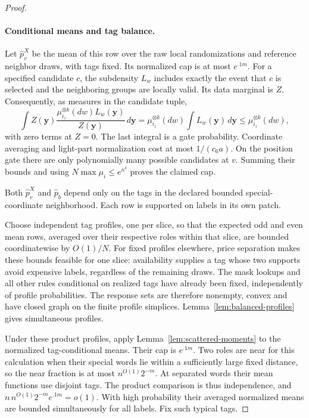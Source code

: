 \begin{proof}
\paragraph{Conditional means and tag balance.}
Let \(\widehat p_v^X\) be the mean of this row over the raw local randomizations and reference neighbor draws, with tags fixed. Its normalized cap is at most \(e^{.1m}\). For a specified candidate \(c\), the subdensity \(L_w\) includes exactly the event that \(c\) is selected and the neighboring groups are locally valid. Its data marginal is \(Z\). Consequently, as measures in the candidate tuple,
\[
 \int Z(\mathbf y)
       \frac{\mu_{i_z}^{\otimes k}(dw)L_w(\mathbf y)}{Z(\mathbf y)}
          \,d\mathbf y
 =\mu_{i_z}^{\otimes k}(dw)\int L_w(\mathbf y)\,d\mathbf y
 \le\mu_{i_z}^{\otimes k}(dw),
\]
with zero terms at \(Z=0\). The last integral is a gate probability. Coordinate averaging and light-part normalization cost at most \(1/(c_6a)\). On the position gate there are only polynomially many possible candidates at \(v\). Summing their bounds and using \(N\max\mu_i\le e^{n^\delta}\) proves the claimed cap.

Both \(\widehat p_v^X\) and \(\widehat p_b\) depend only on the tags in the declared bounded special-coordinate neighborhood. Each row is supported on labels in its own patch.

Choose independent tag profiles, one per slice, so that the expected odd and even mean rows, averaged over their respective roles within that slice, are bounded coordinatewise by \(O(1)/N\). For fixed profiles elsewhere, price separation makes these bounds feasible for one slice: availability supplies a tag whose two supports avoid expensive labels, regardless of the remaining draws. The mask lookups and all other rules conditional on realized tags have already been fixed, independently of profile probabilities. The response sets are therefore nonempty, convex and have closed graph on the finite profile simplices. Lemma~\ref{lem:balanced-profiles} gives simultaneous profiles.

Under these product profiles, apply Lemma~\ref{lem:scattered-moments} to the normalized tag-conditional means. Their cap is \(e^{.1m}\). Two roles are near for this calculation when their special words lie within a sufficiently large fixed distance, so the near fraction is at most \(n^{O(1)}2^{-m}\). At separated words their mean functions use disjoint tags. The product comparison is thus independence, and
\(n\,n^{O(1)}2^{-m}e^{.1m}=o(1)\).
With high probability their averaged normalized means are bounded simultaneously for all labels. Fix such typical tags.


\end{proof}
